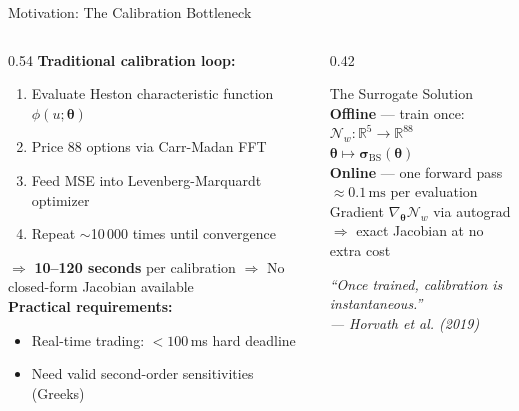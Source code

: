 \documentclass[aspectratio=169, 10pt]{beamer}
\begin{document}
\begin{frame}{Motivation: The Calibration Bottleneck}
  \begin{columns}[T]
    \begin{column}{0.54\textwidth}
      \textbf{Traditional calibration loop:}\\[0.4em]
      \begin{enumerate}\small
        \item Evaluate Heston characteristic function $\phi(u;\boldsymbol\theta)$
        \item Price 88 options via Carr-Madan FFT
        \item Feed MSE into Levenberg-Marquardt optimizer
        \item Repeat $\sim$10\,000 times until convergence
      \end{enumerate}
      \vspace{0.6em}
      \alert{$\Rightarrow$ \textbf{10--120 seconds} per calibration}
      \alert{$\Rightarrow$ No closed-form Jacobian available}\\[0.6em]
      \textbf{Practical requirements:}
      \begin{itemize}\small
        \item Real-time trading: $<100$\,ms hard deadline
        \item Need valid second-order sensitivities (Greeks)
      \end{itemize}
    \end{column}

    \begin{column}{0.42\textwidth}
      \begin{block}{The Surrogate Solution}
        \small
        \textbf{Offline} — train once:\\[0.3em]
        \quad$\mathcal{N}_w : \mathbb{R}^5 \to \mathbb{R}^{88}$\\[0.3em]
        \quad$\boldsymbol\theta \mapsto \boldsymbol\sigma_{\mathrm{BS}}(\boldsymbol\theta)$\\[0.6em]
        \textbf{Online} — one forward pass\\
        \quad$\approx 0.1\,\text{ms}$ per evaluation\\[0.4em]
        Gradient $\nabla_{\!\boldsymbol\theta}\mathcal{N}_w$ via autograd\\
        $\Rightarrow$ exact Jacobian at no extra cost
      \end{block}
      \vspace{0.4em}
      {\small\itshape
       ``Once trained, calibration is instantaneous.''\\
       \hfill— Horvath et al. (2019)}
    \end{column}
  \end{columns}
\end{frame}
\end{document}
